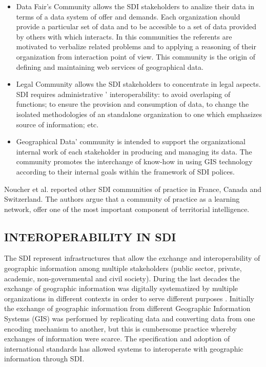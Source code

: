 \documentclass[10pt,twocolumn,ieeetran]{article}
\begin{document}
\begin{itemize}
\item Data Fair's Community allows the SDI stakeholders to analize their data in terms of a data system of offer and demands. Each organization should provide a particular set of data and to be accesible to a set of data provided by others with which interacts. In this communities the referents are motivated to verbalize related problems and to applying a reasoning of their organization from interaction point of view. This community is the origin of defining and maintaining web services of geographical data.
 
\item Legal Community allows the SDI stakeholders to concentrate in legal aspects. SDI requires administrative ' interoperability: to avoid overlaping of functions; to ensure the provision and consumption of data, to change the isolated methodologies of an standalone organization to one which emphasizes source of information; etc.
\item Geographical Data' community is intended to support the organizational internal work of each stakeholder in producing and managing its data. The community promotes the interchange of know-how in using GIS technology according to their internal goals within the framework of SDI polices.
\end{itemize}

Noucher et al. \cite{Noucher2} reported other SDI communities of practice in France, Canada and Switzerland.
The authors \cite{Noucher1} argue that a community of practice as a learning network, offer one of the most important component of territorial intelligence.

\subsection{INTEROPERABILITY IN SDI}

The SDI represent infrastructures that allow the exchange and interoperability of geographic information among multiple stakeholders (public sector, private, academic, non-governmental and civil society). During the last decades the exchange of geographic information was digitally systematized by multiple organizations in different contexts in order to serve different purposes \cite{Delgado} \cite{Georgiadou}.
Initially the exchange of geographic information from different Geographic Information Systems (GIS) was performed by replicating data and converting data from one encoding mechanism to another, but this is cumbersome practice whereby exchanges of information were scarce. The specification and adoption of international standards has allowed systems to interoperate with geographic information through SDI.
\end{document}
